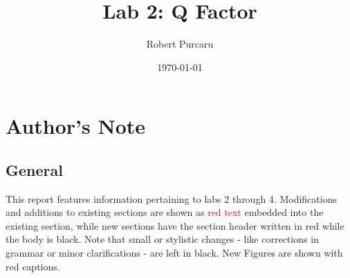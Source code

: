 \documentclass[11pt]{article}
\begin{document}
    \title{Lab 2: Q Factor}
        \author{Robert Purcaru}
        \date{\today}
    \maketitle

    \tableofcontents
    
    \section{Author's Note}
        \subsection{General}
        This report features information pertaining to labs 2 through 4. Modifications and additions to existing sections are shown as \textcolor{red}{red text} embedded into the existing section, while new sections have the section header written in red while the body is black. Note that small or stylistic changes - like corrections in grammar or minor clarifications - are left in black. New Figures are shown with red captions.


        
\end{document}
